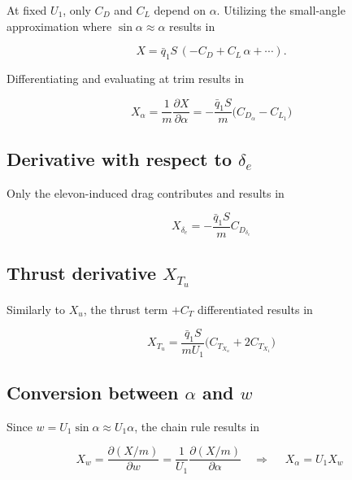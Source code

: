 \documentclass[11pt]{article}
\newcommand{\qbar}{\bar{q}}
\newcommand{\dd}[2]{\dfrac{\partial #1}{\partial #2}}
\begin{document}
At fixed $U_1$, only $C_D$ and $C_L$ depend on $\alpha$.
Utilizing the small-angle approximation where $\sin\alpha \approx \alpha$ results in

\begin{equation}\label{eq:equation_6}
X = \qbar_1 S\,(-C_D + C_L\,\alpha + \cdots).
\end{equation}

Differentiating and evaluating at trim results in

\begin{equation}\label{eq:equation_7}
\boxed{\;X_\alpha = \frac{1}{m}\dd{X}{\alpha} = -\frac{\qbar_1 S}{m}\bigl(C_{D_\alpha} - C_{L_1}\bigr)\;}
\end{equation}

\subsection{Derivative with respect to $\delta_e$}

Only the elevon-induced drag contributes and results in

\begin{equation}\label{eq:equation_8}
\boxed{\;X_{\delta_e} = -\frac{\qbar_1 S}{m}C_{D_{\delta_e}}\;}
\end{equation}

\subsection{Thrust derivative $X_{T_u}$}

Similarly to $X_u$, the thrust term $+C_T$ differentiated results in

\begin{equation}\label{eq:equation_9}
\boxed{\;X_{T_u} = \frac{\qbar_1 S}{mU_1}\bigl(C_{T_{X_u}} + 2C_{T_{X_1}}\bigr)\;}
\end{equation}

\subsection{Conversion between $\alpha$ and $w$}

Since $w = U_1\sin\alpha \approx U_1\alpha$, the chain rule results in

\begin{equation}\label{eq:equation_10}
X_w = \dd{(X/m)}{w} = \frac{1}{U_1}\dd{(X/m)}{\alpha}
\quad\Longrightarrow\quad \boxed{\;X_\alpha = U_1 X_w\;}
\end{equation}
\end{document}

